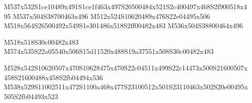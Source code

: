 \documentclass{article}
\begin{document}
\begin{multicols}{5}
\begin{center}
M537x532S1ce10489x491S1ce1f463x497S20500484x521S2c400497x468S2f900518x495 %
M537x504S38700463x496 %
M512x524S10620489x476S22e04495x506 %
M518x564S26500492x549S1e301486x518S2ff00482x483 %
M536x504S38800464x496 %

M518x518S30c00482x483 %
M574x535S22a05540x506S15d11520x488S19a37551x508S30c00482x483 %

M528x542S10620507x470S10628475x470S22c04511x499S22c14473x500S21600507x458S21600488x458S2fb04494x536 %
M538x529S11002511x472S1100a468x477S23100512x501S23110463x502S20e00495x505S2fb04493x523 %

\end{center}
\end{multicols}
\end{document}
